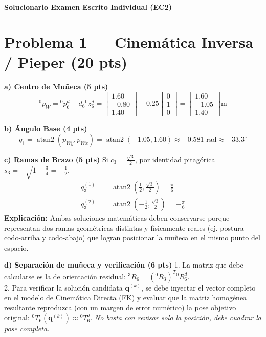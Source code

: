 \documentclass[11pt, a4paper]{article}
\begin{document}
\begin{center}
    \Large\textbf{\textcolor{red!80!black}{Solucionario Examen Escrito Individual (EC2)}}\\[0.2cm]
\end{center}

\section*{Problema 1 — Cinemática Inversa / Pieper (20 pts)}

\textbf{a) Centro de Muñeca (5 pts)}
\begin{equation*}
    {}^0p_W = {}^0p_6^d - d_6{}^0z_6^d = \begin{bmatrix} 1.60 \\ -0.80 \\ 1.40 \end{bmatrix} - 0.25 \begin{bmatrix} 0 \\ 1 \\ 0 \end{bmatrix} = \boxed{ \begin{bmatrix} 1.60 \\ -1.05 \\ 1.40 \end{bmatrix} \text{m} } \text{}
\end{equation*}

\textbf{b) Ángulo Base (4 pts)}
\begin{equation*}
    q_1 = \operatorname{atan2}(p_{Wy}, p_{Wx}) = \operatorname{atan2}(-1.05, 1.60) \approx \boxed{ -0.581 \text{ rad} \approx -33.3^\circ } \text{}
\end{equation*}

\textbf{c) Ramas de Brazo (5 pts)}
Si $c_3 = \frac{\sqrt{3}}{2}$, por identidad pitagórica $s_3 = \pm\sqrt{1 - \frac{3}{4}} = \pm\frac{1}{2}$.
\begin{align*}
    q_3^{(1)} &= \operatorname{atan2}\left( \frac{1}{2}, \frac{\sqrt{3}}{2} \right) = \boxed{ \frac{\pi}{6} } \text{} \\
    q_3^{(2)} &= \operatorname{atan2}\left( -\frac{1}{2}, \frac{\sqrt{3}}{2} \right) = \boxed{ -\frac{\pi}{6} } \text{}
\end{align*}
\textbf{Explicación:} Ambas soluciones matemáticas deben conservarse porque representan dos ramas geométricas distintas y físicamente reales (ej. postura codo-arriba y codo-abajo) que logran posicionar la muñeca en el mismo punto del espacio.

\textbf{d) Separación de muñeca y verificación (6 pts)}
1. La matriz que debe calcularse es la de orientación residual: $\boxed{ {}^3R_6 = ({}^0R_3)^T {}^0R_6^d }$. \\
2. Para verificar la solución candidata $\mathbf{q}^{(k)}$, se debe inyectar el vector completo en el modelo de Cinemática Directa (FK) y evaluar que la matriz homogénea resultante reproduzca (con un margen de error numérico) la pose objetivo original: $\boxed{ {}^0T_6(\mathbf{q}^{(k)}) \approx {}^0T_6^d }$. \textit{No basta con revisar solo la posición, debe cuadrar la pose completa.}
\end{document}

